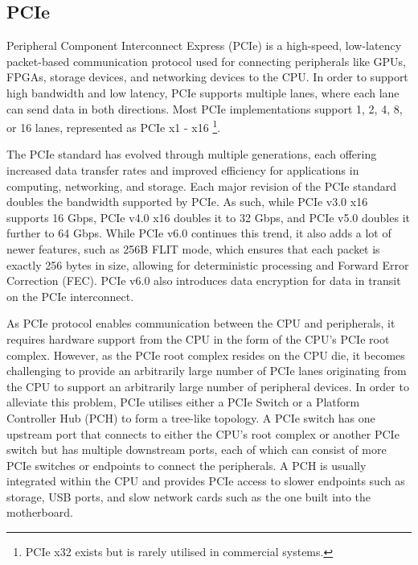 \subsection{PCIe}
\label{subsec:interconnect-sc-background-pcie}

Peripheral Component Interconnect Express (PCIe) is a high-speed, low-latency packet-based communication protocol used for connecting peripherals like GPUs, FPGAs, storage devices, and networking devices to the CPU. 
In order to support high bandwidth and low latency, PCIe supports multiple lanes, where each lane can send data in both directions.
Most PCIe implementations support 1, 2, 4, 8, or 16 lanes, represented as PCIe x1 - x16
\footnote{PCIe x32 exists but is rarely utilised in commercial systems.}.

The PCIe standard has evolved through multiple generations, each offering increased data transfer rates and improved efficiency for applications in computing, networking, and storage.
Each major revision of the PCIe standard doubles the bandwidth supported by PCIe.
As such, while PCIe v3.0 x16 supports 16 Gbps, PCIe v4.0 x16 doubles it to 32 Gbps, and PCIe v5.0 doubles it further to 64 Gbps.
While PCIe v6.0 continues this trend, it also adds a lot of newer features, such as 256B FLIT mode, which ensures that each packet is exactly 256 bytes in size, allowing for deterministic processing and Forward Error Correction (FEC).
PCIe v6.0 also introduces data encryption for data in transit on the PCIe interconnect.

As PCIe protocol enables communication between the CPU and peripherals, it requires hardware support from the CPU in the form of the CPU's PCIe root complex.
However, as the PCIe root complex resides on the CPU die, it becomes challenging to provide an arbitrarily large number of PCIe lanes originating from the CPU to support an arbitrarily large number of peripheral devices.
In order to alleviate this problem, PCIe utilises either a PCIe Switch or a Platform Controller Hub (PCH) to form a tree-like topology.
A PCIe switch has one upstream port that connects to either the CPU's root complex or another PCIe switch but has multiple downstream ports, each of which can consist of more PCIe switches or endpoints to connect the peripherals.
A PCH is usually integrated within the CPU and provides PCIe access to slower endpoints such as storage, USB ports, and slow network cards such as the one built into the motherboard.

